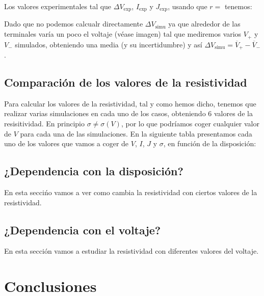 \documentclass[11pt]{article}
\newcommand{\simu}{\text{simu}}
\begin{document}
Los valores experimentales tal que $\Delta V_{\exp}$, $I_{\exp}$ y $J_{\exp}$, usando que $r=$ tenemos: 



Dado que no podemos calcualr directamente $\Delta V_{\simu}$ ya que alrededor de las terminales varía un poco el voltaje (véase imagen) tal que mediremos varios $V_+$ y $V_-$ simulados, obteniendo una media (y su incertidumbre) y así $\Delta V_{\simu} = \overline{V}_+ - \overline{V}_{-} $. 
\newpage

\subsection{Comparación de los valores de la resistividad}

Para calcular los valores de la resistividad, tal y como hemos dicho, tenemos que realizar varias simulaciones en cada uno de los casos, obteniendo 6 valores de la resisitividad. En principio $\sigma \neq \sigma (V)$, por lo que podríamos coger cualquier valor de $V$ para cada una de las simulaciones. En la siguiente tabla presentamos cada uno de los valores que vamos a coger de $V$, $I$, $J$ y $\sigma$, en función de la disposición: 



\newpage

\subsection{¿Dependencia con la disposición?}

En esta seccińo vamos a ver como cambia la resistividad con ciertos valores de la resistividad.

\newpage

\subsection{¿Dependencia con el voltaje?}

En esta sección vamos a estudiar la resistividad con diferentes valores del voltaje. 



\newpage

\section{Conclusiones}


\newpage


\appendix
\end{document}
